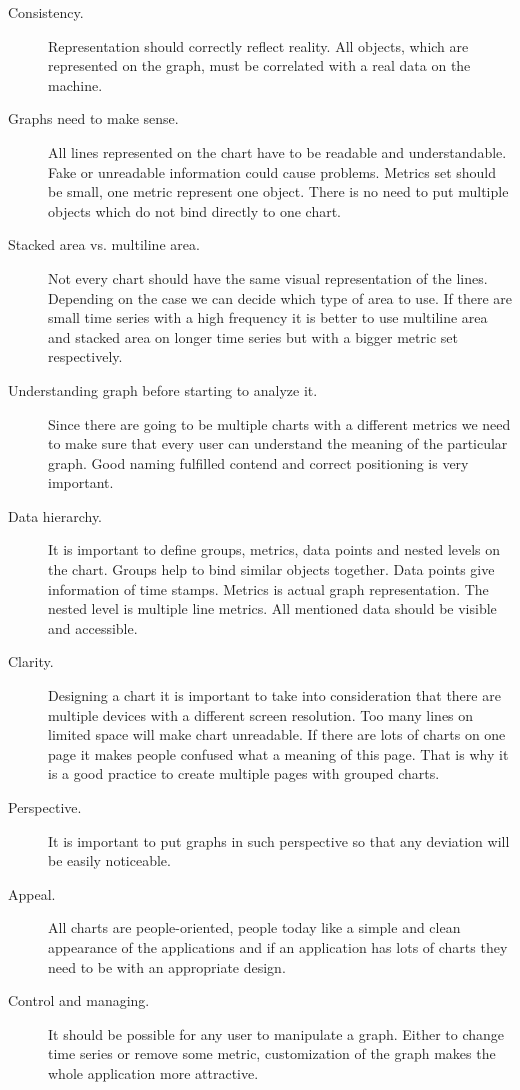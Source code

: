 \begin{description}
\item[Consistency.] Representation should correctly reflect reality. All objects, which are represented on the graph, must be correlated with a real data on the machine. 
\item[Graphs need to make sense.]  All lines represented on the chart have to be readable and understandable.  Fake or unreadable information could cause problems. Metrics set should be small, one metric represent one object. There is no need to put multiple objects which do not bind directly to one chart.
\item[Stacked area vs. multiline area.] Not every chart should have the same visual representation of the lines. Depending on the case we can decide which type of area to use.  If there are small time series with a high frequency it is better to use multiline area and stacked area on longer time series but with a bigger metric set respectively. 
\item[Understanding graph before starting to analyze it. ] Since there are going to be multiple charts with a different metrics we need to make sure that every user can understand the meaning of the particular graph. Good naming fulfilled contend and correct positioning is very important.
\item[Data hierarchy. ] It is important to define groups, metrics, data points and nested levels on the chart.  Groups help to bind similar objects together. Data points give information of time stamps. Metrics is actual graph representation. The nested level is multiple line metrics. All mentioned data should be visible and accessible. 
\item[Clarity.] Designing a chart it is important to take into consideration that there are multiple devices with a different screen resolution. Too many lines on limited space will make chart unreadable.  If there are lots of charts on one page it makes people confused what a meaning of this page. That is why it is a good practice to create multiple pages with grouped charts. 
\item[Perspective.] It is important to put graphs in such perspective so that any deviation will be easily noticeable. 
\item[Appeal.] All charts are people-oriented, people today like a simple and clean appearance of the applications and if an application has lots of charts they need to be with an appropriate design.  
\item[Control and managing.] It should be possible for any user to manipulate a graph. Either to change time series or remove some metric, customization of the graph makes the whole application more attractive.
\end{description}

